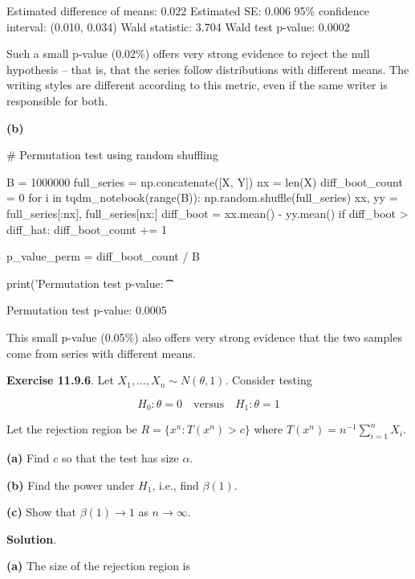 \begin{console}
Estimated difference of means:   0.022
Estimated SE:                    0.006
95\% confidence interval:         (0.010, 0.034)
Wald statistic:                  3.704
Wald test p-value:               0.0002
\end{console}

Such a small p-value (0.02\%) offers very strong evidence to reject the
null hypothesis -- that is, that the series follow distributions with
different means. The writing styles are different according to this
metric, even if the same writer is responsible for both.

\textbf{(b)}

\begin{python}
# Permutation test using random shuffling

B = 1000000
full_series = np.concatenate([X, Y])
nx = len(X)
diff_boot_count = 0
for i in tqdm_{n}otebook(range(B)):
    np.random.shuffle(full_series)
    xx, yy = full_series[:nx], full_series[nx:]
    diff_boot = xx.mean() - yy.mean()
    if diff_boot > diff_hat:
        diff_boot_count += 1
        
p_value_perm = diff_boot_count / B

print('Permutation test p-value: \t\t %
\end{python}


\begin{console}
Permutation test p-value:                0.0005
\end{console}

This small p-value (0.05\%) also offers very strong evidence that the
two samples come from series with different means.

\textbf{Exercise 11.9.6}. Let \(X_{1}, \dots, X_{n} \sim N(\theta, 1)\).
Consider testing

\[ H_{0}: \theta = 0 \quad \text{versus} \quad H_{1}: \theta = 1\]

Let the rejection region be \(R = \{ x^{n} : T(x^{n}) > c \}\) where
\(T(x^{n}) = n^{-1} \sum_{i=1}^{n} X_{i}\).

\textbf{(a)} Find \(c\) so that the test has size \(\alpha\).

\textbf{(b)} Find the power under \(H_{1}\), i.e., find \(\beta(1)\).

\textbf{(c)} Show that \(\beta(1) \rightarrow 1\) as
\(n \rightarrow \infty\).

\textbf{Solution}.

\textbf{(a)} The size of the rejection region is

